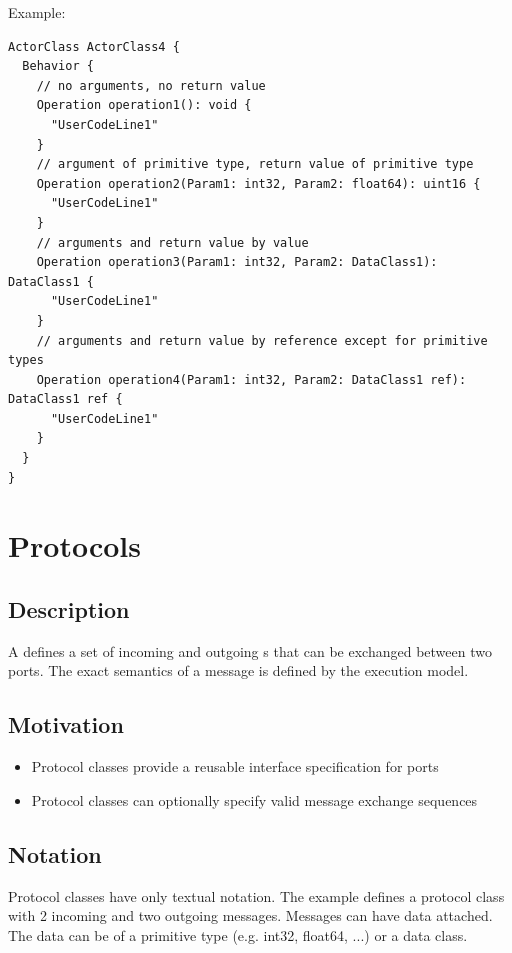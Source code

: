Example:


\begin{lstlisting}
ActorClass ActorClass4 {
  Behavior {
    // no arguments, no return value
    Operation operation1(): void {
      "UserCodeLine1"
    }
    // argument of primitive type, return value of primitive type
    Operation operation2(Param1: int32, Param2: float64): uint16 {
      "UserCodeLine1"
    }
    // arguments and return value by value
    Operation operation3(Param1: int32, Param2: DataClass1): DataClass1 {
      "UserCodeLine1"
    }
    // arguments and return value by reference except for primitive types
    Operation operation4(Param1: int32, Param2: DataClass1 ref): DataClass1 ref {
      "UserCodeLine1"
    }
  }
}
\end{lstlisting}

\section{Protocols}

\subsection{Description}

A  defines a set of incoming and outgoing s that can be exchanged between two ports.
The exact semantics of a message is defined by the execution model.

\subsection{Motivation}

\begin{itemize}
\item Protocol classes provide a reusable interface specification for ports
\item Protocol classes can optionally specify valid message exchange sequences
\end{itemize}

\subsection{Notation}

Protocol classes have only textual notation. 
The example defines a protocol class with 2 incoming and two outgoing messages. Messages can have data 
attached. The data can be of a primitive type (e.g. int32, float64, ...) or a data class.

